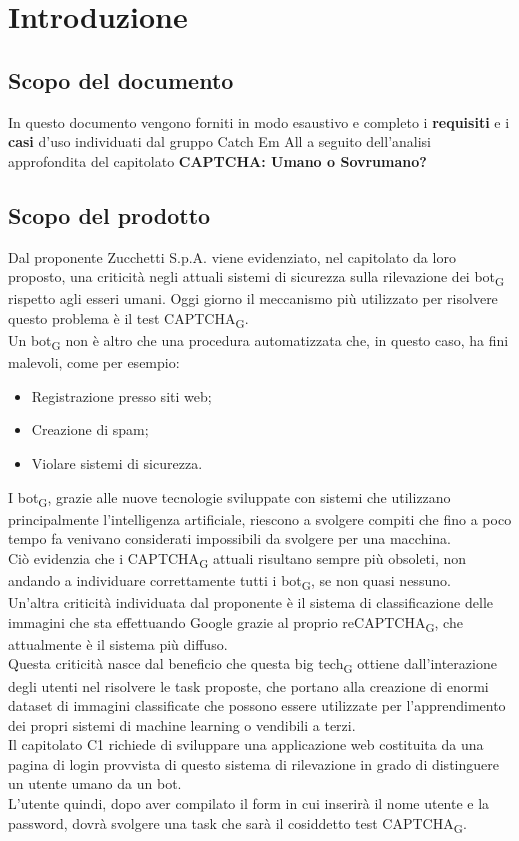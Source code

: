 \section{Introduzione}

\subsection{Scopo del documento}
In questo documento vengono forniti in modo esaustivo e completo i \textbf{requisiti} e i \textbf{casi} d'uso individuati dal gruppo Catch Em All a seguito dell'analisi approfondita del capitolato \textbf{CAPTCHA: Umano o Sovrumano?}

\subsection{Scopo del prodotto}
Dal proponente Zucchetti S.p.A. viene evidenziato, nel capitolato da loro proposto, una criticità negli attuali sistemi di sicurezza sulla rilevazione dei bot\textsubscript{G} rispetto agli esseri umani. Oggi giorno il meccanismo più utilizzato per risolvere questo problema è il test CAPTCHA\textsubscript{G}.\\
Un bot\textsubscript{G} non è altro che una procedura automatizzata che, in questo caso, ha fini malevoli, come per esempio:
\begin{itemize}
 	\item Registrazione presso siti web;
	\item Creazione di spam;
	\item Violare sistemi di sicurezza.
\end{itemize}
I bot\textsubscript{G}, grazie alle nuove tecnologie sviluppate con sistemi che utilizzano principalmente l'intelligenza artificiale, riescono a svolgere compiti che fino a poco tempo fa venivano considerati impossibili da svolgere per una macchina.\\
Ciò evidenzia che i CAPTCHA\textsubscript{G} attuali risultano sempre più obsoleti, non andando a individuare correttamente tutti i bot\textsubscript{G}, se non quasi nessuno.\\
Un'altra criticità individuata dal proponente è il sistema di classificazione delle immagini che sta effettuando Google grazie al proprio reCAPTCHA\textsubscript{G}, che attualmente è il sistema più diffuso.\\
Questa criticità nasce dal beneficio che questa big tech\textsubscript{G} ottiene dall'interazione degli utenti nel risolvere le task proposte, che portano alla creazione di enormi dataset di immagini classificate che possono essere utilizzate per l'apprendimento dei propri sistemi di machine learning o vendibili a terzi.\\
Il capitolato C1 richiede di sviluppare una applicazione web costituita da una pagina di login provvista di questo sistema di rilevazione in grado di distinguere un utente umano da un bot.\\
L'utente quindi, dopo aver compilato il form in cui inserirà il nome utente e la password, dovrà svolgere una task che sarà il cosiddetto test CAPTCHA\textsubscript{G}.



